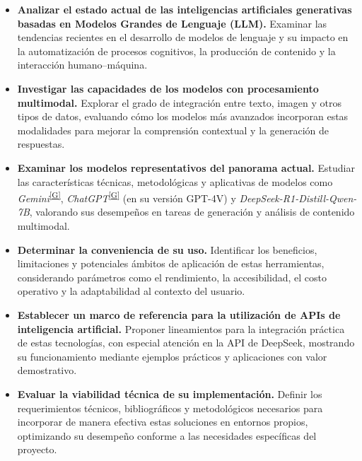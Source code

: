 \documentclass[12pt,a4paper]{report}
\numberwithin{figure}{section}
\begin{document}
\begin{itemize}
    \item \textbf{Analizar el estado actual de las inteligencias artificiales generativas basadas en Modelos Grandes de Lenguaje (LLM).}  
    Examinar las tendencias recientes en el desarrollo de modelos de lenguaje y su impacto en la automatización de procesos cognitivos, la producción de contenido y la interacción humano–máquina.

    \item \textbf{Investigar las capacidades de los modelos con procesamiento multimodal.}  
    Explorar el grado de integración entre texto, imagen y otros tipos de datos, evaluando cómo los modelos más avanzados incorporan estas modalidades para mejorar la comprensión contextual y la generación de respuestas.

    \item \textbf{Examinar los modelos representativos del panorama actual.}  
    Estudiar las características técnicas, metodológicas y aplicativas de modelos como \textit{Gemini}\textsuperscript{\hyperref[glos:gemini]{[G]}}, \textit{ChatGPT}\textsuperscript{\hyperref[glos:chatgpt]{[G]}} (en su versión GPT-4V) y \textit{DeepSeek-R1-Distill-Qwen-7B}, valorando sus desempeños en tareas de generación y análisis de contenido multimodal.

    \item \textbf{Determinar la conveniencia de su uso.}  
    Identificar los beneficios, limitaciones y potenciales ámbitos de aplicación de estas herramientas, considerando parámetros como el rendimiento, la accesibilidad, el costo operativo y la adaptabilidad al contexto del usuario.

    \item \textbf{Establecer un marco de referencia para la utilización de APIs de inteligencia artificial.}  
    Proponer lineamientos para la integración práctica de estas tecnologías, con especial atención en la API de DeepSeek, mostrando su funcionamiento mediante ejemplos prácticos y aplicaciones con valor demostrativo.

    \item \textbf{Evaluar la viabilidad técnica de su implementación.}  
    Definir los requerimientos técnicos, bibliográficos y metodológicos necesarios para incorporar de manera efectiva estas soluciones en entornos propios, optimizando su desempeño conforme a las necesidades específicas del proyecto.
\end{itemize}
\end{document}
